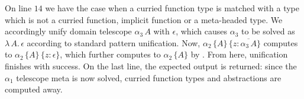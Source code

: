 \documentclass[acmsmall,review,anonymous,prologue,dvipsnames]{acmart}\settopmatter{printfolios=true,printccs=false,printacmref=false}
\newcommand{\slet}{\boldsymbol{\mathsf{let}}}
\renewcommand{\sin}{\boldsymbol{\mathsf{in}}}
\renewcommand{\U}{\mathsf{U}}
\newcommand{\emptycon}{\scaleobj{.75}\bullet}
\newcommand{\unify}{\mathsf{unify}}
\newcommand{\echeckt}[2]{\llbracket#1\rrbracket\!\Downarrow\,#2}
\newcommand{\einfert}[1]{\llbracket#1\rrbracket\!\Uparrow}
\newcommand{\true}{\mathsf{true}}
\newcommand{\Tel}{\mathsf{Tel}}
\newcommand{\Rec}{\mathsf{Rec}}
\newcommand{\ol}[1]{\overline{#1}}
\theoremstyle{remark}
\begin{document}
\begin{example}
On line $\scriptstyle{14}$ we have the case when a curried function type is
matched with a type which is not a curried function, implicit function or a
meta-headed type. We accordingly unify domain telescope $\alpha_3\,A$ with
$\epsilon$, which causes $\alpha_3$ to be solved as $\lambda\,A.\,\epsilon$
according to standard pattern unification. Now, $\alpha_2\,\{A\}\,\{z :
\ol{\alpha_3\,A}\}$ computes to $\alpha_2\,\{A\}\,\{z : \epsilon\}$, which
further computes to $\alpha_2\,\{A\}$ by . From here,
unification finishes with success. On the last line, the expected output is
returned: since the $\alpha_1$ telescope meta is now solved, curried function
types and abstractions are computed away.
\end{example}

\end{document}
